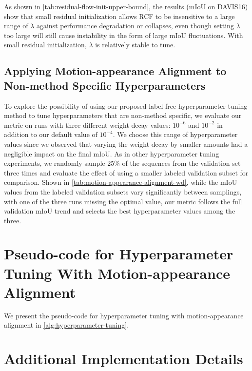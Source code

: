 As shown in \cref{tab:residual-flow-init-upper-bound}, the results (mIoU on DAVIS16) show that small residual initialization allows RCF to be insensitive to a large range of $\lambda$ against performance degradation or {\color{red}collapses}, even though setting $\lambda$ too large will still cause instability in the form of large mIoU fluctuations. With small residual initialization, $\lambda$ is relatively stable to tune. 

\subsection{Applying Motion-appearance Alignment to Non-method Specific Hyperparameters}
To explore the possibility of using our proposed label-free hyperparameter tuning method to tune hyperparameters that are non-method specific, we evaluate our metric on runs with three different weight decay values: $10^{-6}$ and $10^{-2}$ in addition to our default value of $10^{-4}$. We choose this range of hyperparameter values since we observed that varying the weight decay by smaller amounts had a negligible impact on the final mIoU. As in other hyperparameter tuning experiments, we randomly sample $25\%$ of the sequences from the validation set three times and evaluate the effect of using a smaller labeled validation subset for comparison. Shown in \cref{tab:motion-appearance-alignment-wd}, while the mIoU values from the labeled validation subsets vary significantly between samplings, with one of the three runs missing the optimal value, our metric follows the full validation mIoU trend and selects the best hyperparameter values among the three.


\section{Pseudo-code for Hyperparameter Tuning With Motion-appearance Alignment}
We present the pseudo-code for hyperparameter tuning with motion-appearance alignment in \cref{alg:hyperparameter-tuning}.

\section{Additional Implementation Details}


